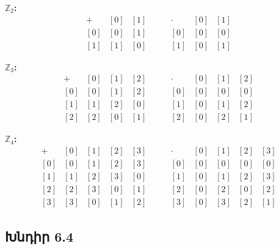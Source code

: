 \textbf{$\mathbb{Z}_2$:}
\[
\begin{array}{c|cc}
+ & [0] & [1] \\\hline
{[0]} & [0] & [1] \\
{[1]} & [1] & [0]
\end{array}
\qquad
\begin{array}{c|cc}
\cdot & [0] & [1] \\\hline
{[0]} & [0] & [0] \\
{[1]} & [0] & [1]
\end{array}
\]

\textbf{$\mathbb{Z}_3$:}
\[
\begin{array}{c|ccc}
+ & [0] & [1] & [2] \\\hline
{[0]} & [0] & [1] & [2] \\
{[1]} & [1] & [2] & [0] \\
{[2]} & [2] & [0] & [1]
\end{array}
\qquad
\begin{array}{c|ccc}
\cdot & [0] & [1] & [2] \\\hline
{[0]} & [0] & [0] & [0] \\
{[1]} & [0] & [1] & [2] \\
{[2]} & [0] & [2] & [1]
\end{array}
\]

\textbf{$\mathbb{Z}_4$:}
\[
\begin{array}{c|cccc}
+ & [0] & [1] & [2] & [3] \\\hline
{[0]} & [0] & [1] & [2] & [3] \\
{[1]} & [1] & [2] & [3] & [0] \\
{[2]} & [2] & [3] & [0] & [1] \\
{[3]} & [3] & [0] & [1] & [2]
\end{array}
\qquad
\begin{array}{c|cccc}
\cdot & [0] & [1] & [2] & [3] \\\hline
{[0]} & [0] & [0] & [0] & [0] \\
{[1]} & [0] & [1] & [2] & [3] \\
{[2]} & [0] & [2] & [0] & [2] \\
{[3]} & [0] & [3] & [2] & [1]
\end{array}
\]


\subsection*{Խնդիր 6.4}

